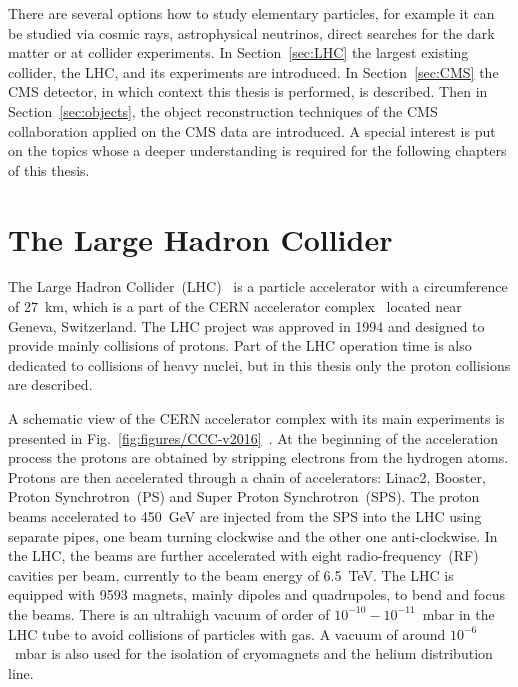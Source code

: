 \clearpage

\setcounter{secnumdepth}{4}
\setcounter{secnumdepth}{5}

There are several options how to study elementary particles, for example it can be studied via cosmic rays, astrophysical neutrinos, direct searches for the dark matter or at collider experiments. In Section~\ref{sec:LHC} the largest existing collider, the LHC, and its experiments are introduced. In Section~\ref{sec:CMS} the CMS detector, in which context this thesis is performed, is described. Then in Section~\ref{sec:objects}, the object reconstruction techniques of the CMS collaboration applied on the CMS data are introduced. A special interest is put on the topics whose a deeper understanding is required for the following chapters of this thesis.

\section{The Large Hadron Collider~\label{sec:LHC}}

The Large Hadron Collider~(LHC)~\cite{Evans:2008zzb} is a particle accelerator with a circumference of 27~km, which is a part of the CERN accelerator complex~\cite{Bruning:2004ej} located near Geneva, Switzerland. The LHC project was approved in 1994 and designed to provide mainly collisions of protons. Part of the LHC operation time is also dedicated to collisions of heavy nuclei, but in this thesis only the proton collisions are described.

A schematic view of the CERN accelerator complex with its main experiments is presented in Fig.~\ref{fig:figures/CCC-v2016}~\cite{Mobs:2225847}. At the beginning of the acceleration process the protons are obtained by stripping electrons from the hydrogen atoms. Protons are then accelerated through a chain of accelerators: Linac2, Booster, Proton Synchrotron~(PS) and Super Proton Synchrotron~(SPS). The proton beams accelerated to 450~GeV are injected from the SPS into the LHC using separate pipes, one beam turning clockwise and the other one anti-clockwise. In the LHC, the beams are further accelerated with eight radio-frequency~(RF) cavities per beam, currently to the beam energy of 6.5~TeV. The LHC is equipped with 9593 magnets, mainly dipoles and quadrupoles, to bend and focus the beams. There is an ultrahigh vacuum of order of $10^{-10}-10^{-11}$~mbar in the LHC tube to avoid collisions of particles with gas. A vacuum of around $10^{-6}$~mbar is also used for the isolation  of cryomagnets and the helium distribution line.

